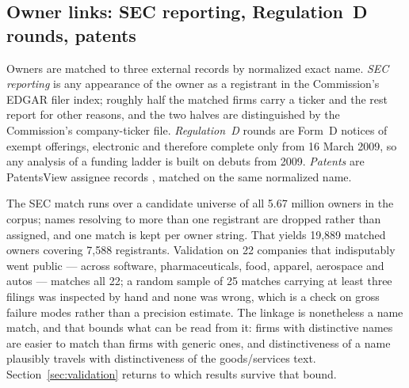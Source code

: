 \subsection{Owner links: SEC reporting, Regulation~D rounds, patents}\label{sec:links}

Owners are matched to three external records by normalized exact name.
\emph{SEC reporting} is any appearance of the owner as a registrant in the
Commission's EDGAR filer index; roughly half the matched firms carry a
ticker and the rest report for other reasons, and the two halves are
distinguished by the Commission's company-ticker file. \emph{Regulation~D}
rounds are Form~D notices of exempt offerings, electronic and therefore
complete only from 16 March 2009, so any analysis of a funding ladder is
built on debuts from 2009. \emph{Patents} are PatentsView assignee records
\citep{PatentsView}, matched on the same normalized name.

The SEC match runs over a candidate universe of all 5.67 million owners in
the corpus; names resolving to more than one registrant are dropped rather
than assigned, and one match is kept per owner string. That yields
19{,}889 matched owners covering 7{,}588 registrants. Validation on 22
companies that indisputably went public --- across software,
pharmaceuticals, food, apparel, aerospace and autos --- matches all 22; a
random sample of 25 matches carrying at least three filings was inspected
by hand and none was wrong, which is a check on gross failure modes rather
than a precision estimate. The linkage is nonetheless a name match, and
that bounds what can be read from it: firms with distinctive names are
easier to match than firms with generic ones, and distinctiveness of a
name plausibly travels with distinctiveness of the goods/services text.
Section~\ref{sec:validation} returns to which results survive that bound.
